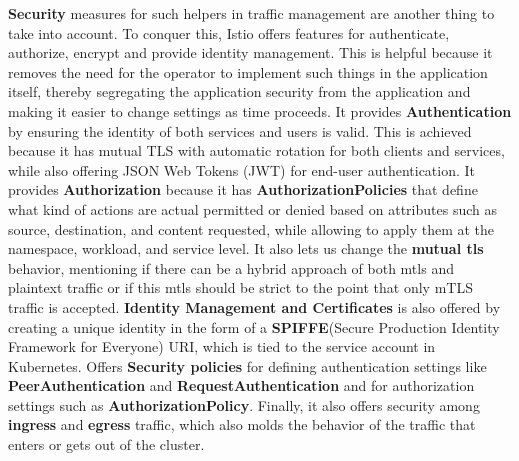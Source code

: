 \textbf{Security} measures for such helpers in traffic management are another thing to take into account. To conquer this, Istio offers features for authenticate, authorize, encrypt and provide identity management. This is helpful because it removes the need for the operator to implement such things in the application itself, thereby segregating the application security from the application and making it easier to change settings as time proceeds. It provides \textbf{Authentication} by ensuring the identity of both services and users is valid. This is achieved because it has mutual TLS with automatic rotation for both clients and services, while also offering JSON Web Tokens (JWT) for end-user authentication. It provides \textbf{Authorization} because it has \textbf{AuthorizationPolicies} that define what kind of actions are actual permitted or denied based on attributes such as source, destination, and content requested, while allowing to apply them at the namespace, workload, and service level. It also lets us change the \textbf{mutual tls} behavior, mentioning if there can be a hybrid approach of both mtls and plaintext traffic or if this mtls should be strict to the point that only mTLS traffic is accepted. \textbf{Identity Management and Certificates} is also offered by creating a unique identity in the form of a \textbf{SPIFFE}(Secure Production Identity Framework for Everyone) URI, which is tied to the service account in Kubernetes. Offers \textbf{Security policies} for defining authentication settings like \textbf{PeerAuthentication} and \textbf{RequestAuthentication} and for authorization settings such as \textbf{AuthorizationPolicy}. Finally, it also offers security among \textbf{ingress} and \textbf{egress} traffic, which also molds the behavior of the traffic that enters or gets out of the cluster.

